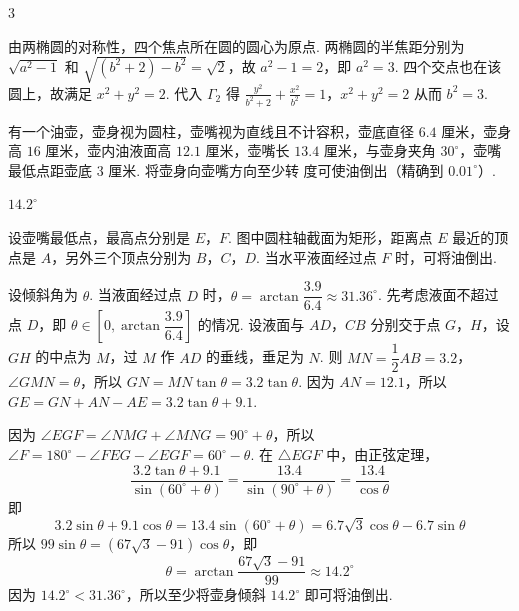 \begin{answer}
\(3\)
\end{answer}

\begin{solution}
由两椭圆的对称性，四个焦点所在圆的圆心为原点. 两椭圆的半焦距分别为 \(\sqrt{a^2-1}\) 和 \(\sqrt{(b^2+2)-b^2}=\sqrt2\)，故 \(a^2-1=2\)，即 \(a^2=3\). 四个交点也在该圆上，故满足 \(x^2+y^2=2\). 代入 \(\Gamma_2\) 得
\(\frac{y^2}{b^2+2}+\frac{x^2}{b^2}=1\)，\(x^2+y^2=2\)
从而 \(b^2=3\).
\end{solution}

\begin{problem}
有一个油壶，壶身视为圆柱，壶嘴视为直线且不计容积，壶底直径 \(6.4\text{ 厘米}\)，壶身高 \(16\text{ 厘米}\)，壶内油液面高 \(12.1\text{ 厘米}\)，壶嘴长 \(13.4\text{ 厘米}\)，与壶身夹角 \(30^\circ\)，壶嘴最低点距壶底 \(3\text{ 厘米}\). 将壶身向壶嘴方向至少转\fillinblank{}\(\text{ 度}\)可使油倒出（精确到 \(0.01^\circ\)）.

\end{problem}

\begin{answer}
\(14.2^\circ\)
\end{answer}

\begin{solution}

设壶嘴最低点，最高点分别是 \(E\)，\(F\). 图中圆柱轴截面为矩形，距离点 \(E\) 最近的顶点是 \(A\)，另外三个顶点分别为 \(B\)，\(C\)，\(D\). 当水平液面经过点 \(F\) 时，可将油倒出.

设倾斜角为 \(\theta\). 当液面经过点 \(D\) 时，\(\theta=\arctan\dfrac{3.9}{6.4}\approx31.36^\circ\). 先考虑液面不超过点 \(D\)，即 \(\theta\in\left[0,\arctan\dfrac{3.9}{6.4}\right]\) 的情况. 设液面与 \(AD\)，\(CB\) 分别交于点 \(G\)，\(H\)，设 \(GH\) 的中点为 \(M\)，过 \(M\) 作 \(AD\) 的垂线，垂足为 \(N\). 则 \(MN=\dfrac12AB=3.2\)，\(\angle GMN=\theta\)，所以 \(GN=MN\tan\theta=3.2\tan\theta\). 因为 \(AN=12.1\)，所以 \(GE=GN+AN-AE=3.2\tan\theta+9.1\).

因为 \(\angle EGF=\angle NMG+\angle MNG=90^\circ+\theta\)，所以 \(\angle F=180^\circ-\angle FEG-\angle EGF=60^\circ-\theta\). 在 \(\triangle EGF\) 中，由正弦定理，
\[
\frac{3.2\tan\theta+9.1}{\sin(60^\circ+\theta)}
=\frac{13.4}{\sin(90^\circ+\theta)}
=\frac{13.4}{\cos\theta}
\]
即
\[
3.2\sin\theta+9.1\cos\theta
=13.4\sin(60^\circ+\theta)
=6.7\sqrt3\cos\theta-6.7\sin\theta
\]
所以 \(99\sin\theta=(67\sqrt3-91)\cos\theta\)，即
\[
\theta=\arctan\frac{67\sqrt3-91}{99}\approx14.2^\circ
\]
因为 \(14.2^\circ<31.36^\circ\)，所以至少将壶身倾斜 \(14.2^\circ\) 即可将油倒出.
\end{solution}


